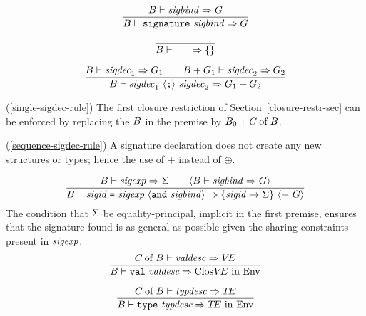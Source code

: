 \begin{equation}	%
\label{single-sigdec-rule}
\frac{ \B\ts\sigbind\ra\G }
     { \B\ts\singsigdec\ra\G }\index{41.3}
\end{equation}

\begin{equation}	%
\frac{}
     { \B\ts\emptysigdec\ra\emptymap }
\end{equation}

\begin{equation}	%
\label{sequence-sigdec-rule}
\frac{ \B\ts\sigdec_1\ra\G_1 \qquad \plusmap{\B}{\G_1}\ts\sigdec_2\ra\G_2 }
     { \B\ts\seqsigdec\ra\plusmap{\G_1}{\G_2} }
\end{equation}
\comments
\begin{description}
%
\item{(\ref{single-sigdec-rule})}
The first closure restriction of Section~\ref{closure-restr-sec}
can be  enforced by replacing the $B$ in the premise by $B_0+G \mathbin{\rm of} B$.

\item{(\ref{sequence-sigdec-rule})}
   A signature declaration does not create any new structures
or types; hence the use of $+$ instead of $\oplus$.
\end{description}

\begin{equation}	%
\label{sigbind-rule}
\frac{ \B\ts\sigexp\ra\sig
        \qquad\langle\B\ts\sigbind\ra\G\rangle }
     { \B\ts\sigbinder\ra\{\sigid\mapsto\sig\}
       \ \langle +\ \G\rangle }\index{42.1}
\end{equation}
\comment The  condition that $\Sigma$ be equality-principal,
implicit in the first premise, ensures that the
signature found is as general as possible given the sharing
constraints present in ${\it sigexp}$. 
%
\begin{equation}        %
\label{valspec-rule}
\frac{ \of{\C}{\B}\ts\valdesc\ra\VE }
     { \B\ts\valspec\ra\cl{}{\VE}\ \In\ \Env }\index{42.2}
\end{equation}

\begin{equation}        %
\label{typespec-rule}
\frac{ \of{\C}{\B}\ts\typdesc\ra\TE }
     { \B\ts\typespec\ra\TE\ \In\ \Env }
\end{equation}

